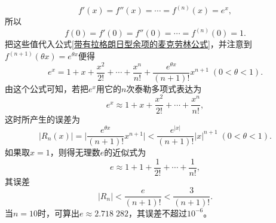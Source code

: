 \begin{equation*}
  f'(x)=f''(x)=\cdots=f^{(n)}(x) = e^x,
\end{equation*}
所以
\begin{equation*}
  f(0)=f'(0)=f''(0)=\cdots=f^{(n)}(0) = 1.
\end{equation*}
把这些值代入公式\eqref{带有拉格朗日型余项的麦克劳林公式}，并注意到$f^{(n+1)}(\theta x) = e^{\theta x}$便得
\begin{equation*}
  e^x = 1 + x + \frac{x^2}{2!} + \cdots + \frac{x^n}{n!} + \frac{e^{\theta x}}{(n+1)!}x^{n+1} \; (0 < \theta < 1).
\end{equation*}
由这个公式可知，若把$e^x$用它的$n$次泰勒多项式表达为
\begin{equation*}
  e^x \approx 1 + x + \frac{x^2}{2!} + \cdots + \frac{x^n}{n!},
\end{equation*}
这时所产生的误差为
\begin{equation*}
  |R_n(x)| = \Big|\frac{e^{\theta x}}{(n+1)!}x^{n+1}\Big| < \frac{e^{|x|}}{(n+1)!}|x|^{n+1} \; (0 < \theta < 1).
\end{equation*}
如果取$x=1$，则得无理数$e$的近似式为
\begin{equation*}
  e \approx 1 + 1 + \frac{1}{2!} + \cdots + \frac{1}{n!},
\end{equation*}
其误差
\begin{equation*}
  |R_n| < \frac{e}{(n+1)!} < \frac{3}{(n+1)!}.
\end{equation*}
当$n = 10$时，可算出$e\approx2.718 \; 282$，其误差不超过$10^{-6}$。

